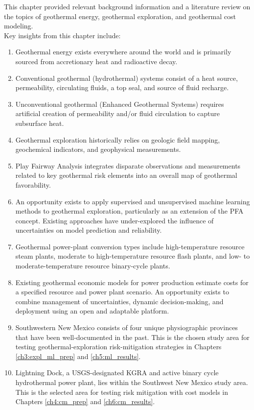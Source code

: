 This chapter provided relevant background information and a literature review on the topics of geothermal energy, geothermal exploration, and geothermal cost modeling.
\\
Key insights from this chapter include:
\begin{enumerate}
    \item Geothermal energy exists everywhere around the world and is primarily sourced from accretionary heat and radioactive decay.
    \item Conventional geothermal (hydrothermal) systems consist of a heat source, permeability, circulating fluids, a top seal, and source of fluid recharge.
    \item Unconventional geothermal (Enhanced Geothermal Systems) requires artificial creation of permeability and/or fluid circulation to capture subsurface heat.
    \item Geothermal exploration historically relies on geologic field mapping, geochemical indicators, and geophysical measurements.
    \item Play Fairway Analysis integrates disparate observations and measurements related to key geothermal risk elements into an overall map of geothermal favorability.
    \item An opportunity exists to apply supervised and unsupervised machine learning methods to geothermal exploration, particularly as an extension of the PFA concept. Existing approaches have under-explored the influence of uncertainties on model prediction and reliability.

    \item Geothermal power-plant conversion types include high-temperature resource steam plants, moderate to high-temperature resource flash plants, and low- to moderate-temperature resource binary-cycle plants. 

    \item Existing geothermal economic models for power production estimate costs for a specified resource and power plant scenario. An opportunity exists to combine management of uncertainties, dynamic decision-making, and deployment using an open and adaptable platform.

    \item Southwestern New Mexico consists of four unique physiographic provinces that have been well-documented in the past. This is the chosen study area for testing geothermal-exploration risk-mitigation strategies in Chapters \ref{ch3:expl_ml_prep} and \ref{ch5:ml_results}.
    \item Lightning Dock, a USGS-designated KGRA and active binary cycle hydrothermal power plant, lies within the Southwest New Mexico study area. This is the selected area for testing risk mitigation with cost models in Chapters \ref{ch4:cm_prep} and \ref{ch6:cm_results}.
\end{enumerate}